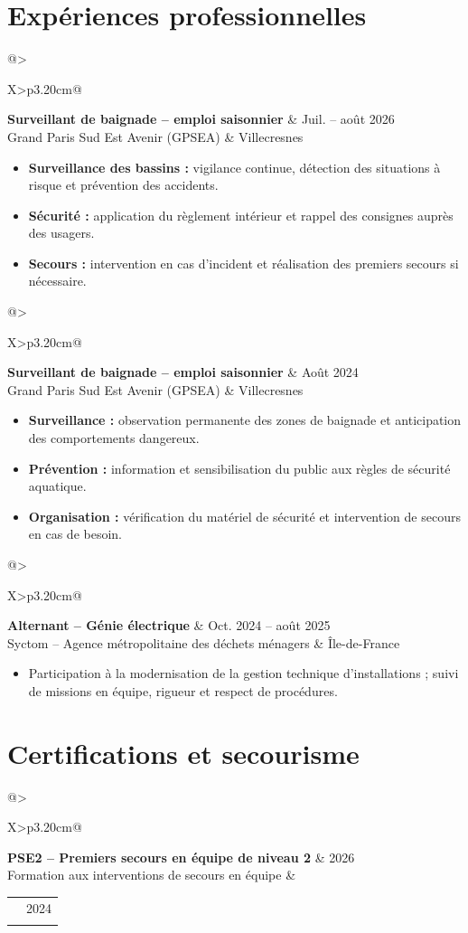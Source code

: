 \documentclass[10pt,a4paper]{extarticle}
\makeatletter
\newcommand{\entry}[4]{%
\begin{tabularx}{\linewidth}{@{}>{\raggedright\arraybackslash}X>{\raggedleft\arraybackslash}p{3.20cm}@{}}
 {\bfseries\color{bleu}#1} & {\fontsize{9.4}{10.8}\selectfont\color{secondaire}#2} \\[-1pt]
 {\fontsize{9.4}{11}\selectfont\color{secondaire}#3} & {\fontsize{9.4}{10.8}\selectfont\color{secondaire}#4}
\end{tabularx}\vspace{-2.5pt}\par}
\newcommand{\gapentry}{\vspace{5.4pt}}
\makeatother
\begin{document}
\section{Expériences professionnelles}
\entry{Surveillant de baignade -- emploi saisonnier}{Juil. -- août 2026}{Grand Paris Sud Est Avenir (GPSEA)}{Villecresnes}
\begin{itemize}
  \item \textbf{Surveillance des bassins :} vigilance continue, détection des situations à risque et prévention des accidents.
  \item \textbf{Sécurité :} application du règlement intérieur et rappel des consignes auprès des usagers.
  \item \textbf{Secours :} intervention en cas d'incident et réalisation des premiers secours si nécessaire.
\end{itemize}
\gapentry
\entry{Surveillant de baignade -- emploi saisonnier}{Août 2024}{Grand Paris Sud Est Avenir (GPSEA)}{Villecresnes}
\begin{itemize}
  \item \textbf{Surveillance :} observation permanente des zones de baignade et anticipation des comportements dangereux.
  \item \textbf{Prévention :} information et sensibilisation du public aux règles de sécurité aquatique.
  \item \textbf{Organisation :} vérification du matériel de sécurité et intervention de secours en cas de besoin.
\end{itemize}
\gapentry
\entry{Alternant -- Génie électrique}{Oct. 2024 -- août 2025}{Syctom -- Agence métropolitaine des déchets ménagers}{Île-de-France}
\begin{itemize}
  \item Participation à la modernisation de la gestion technique d'installations ; suivi de missions en équipe, rigueur et respect de procédures.
\end{itemize}

\section{Certifications et secourisme}
\entry{PSE2 -- Premiers secours en équipe de niveau 2}{2026}{Formation aux interventions de secours en équipe}{}
\gapentry
\entry{BNSSA -- Brevet national de sécurité et de sauvetage aquatique}{2024}{Croix Blanche -- Orsay}{}
\end{document}
